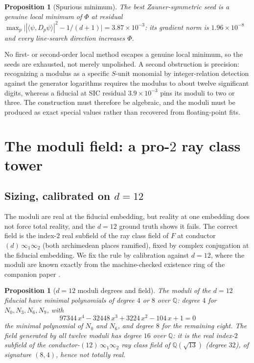 \documentclass[12pt,a4paper]{article}
\newtheorem{proposition}[theorem]{Proposition}
\newcommand{\Fd}{F}
\begin{document}
\begin{proposition}[Spurious minimum]
\label{prop:spurious}
The best Zauner-symmetric seed is a genuine local minimum of $\Phi$ at residual
$\max_p\big||\langle\psi,D_p\psi\rangle|^2 - 1/(d+1)\big| = 3.87\times 10^{-3}$:
its gradient norm is $1.96\times 10^{-8}$ and every line-search direction
increases $\Phi$.
\end{proposition}

No first- or second-order local method escapes a genuine local minimum, so the
seeds are exhausted, not merely unpolished. A second obstruction is precision:
recognizing a modulus as a specific $S$-unit monomial by integer-relation
detection against the generator logarithms requires the modulus to about twelve
significant digits, whereas a fiducial at SIC residual $3.9\times 10^{-3}$ pins
its moduli to two or three. The construction must therefore be algebraic, and
the moduli must be produced as exact special values rather than recovered from
floating-point fits.

\section{The moduli field: a pro-$2$ ray class tower}
\label{sec:tower}

\subsection{Sizing, calibrated on $d=12$}

The moduli are real at the fiducial embedding, but reality at one embedding does
not force total reality, and the $d=12$ ground truth shows it fails. The correct
field is the index-$2$ real subfield of the ray class field of $\Fd$ at conductor
$(d)\,\infty_1\infty_2$ (both archimedean places ramified), fixed by complex
conjugation at the fiducial embedding. We fix the rule by calibration against
$d=12$, where the moduli are known exactly from the machine-checked existence
ring of the companion paper \cite{StarkHilbert12}.

\begin{proposition}[$d=12$ moduli degrees and field]
\label{prop:d12-deg}
The moduli of the $d=12$ fiducial have minimal polynomials of degree $4$ or $8$
over $\mathbb{Q}$: degree $4$ for $N_0, N_3, N_6, N_9$, with
\[
97344\,x^4 - 32448\,x^3 + 3224\,x^2 - 104\,x + 1 = 0
\]
the minimal polynomial of $N_0$ and $N_6$, and degree $8$ for the remaining
eight. The field generated by all twelve moduli has degree $16$ over
$\mathbb{Q}$: it is the real index-$2$ subfield of the
conductor-$(12)\,\infty_1\infty_2$ ray class field of $\mathbb{Q}(\sqrt{13})$
(degree $32$), of signature $(8,4)$, hence not totally real.
\end{proposition}
\end{document}
